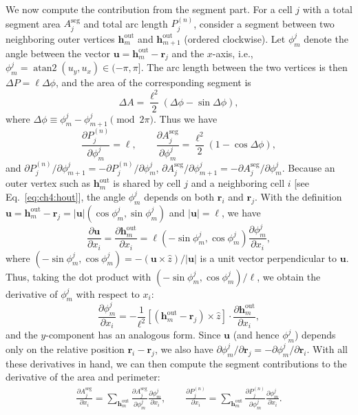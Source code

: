 We now compute the contribution from the segment part. For a cell $j$ with a total segment area $A_j^\textrm{seg}$ and total arc length $P_j^{(n)}$, consider a segment between two neighboring outer vertices $\mathbf{h}^\textrm{out}_m$ and $\mathbf{h}^\textrm{out}_{m+1}$ (ordered clockwise). Let $\phi_m^{j}$ denote the angle between the vector $\mathbf{u}=\mathbf{h}^\textrm{out}_m - \mathbf{r}_j$ and the $x$-axis, i.e., $\phi_m^j=\operatorname{atan2}(u_y, u_x)\in(-\pi,\pi]$. The arc length between the two vertices is then $\Delta P=\ell\Delta\phi$, and the area of the corresponding segment is
\begin{equation}
    \Delta A = \frac{\ell^2}{2}(\Delta\phi-\sin\Delta\phi),
\end{equation}
where $\Delta\phi\equiv \phi_m^{j}-\phi_{m+1}^{j}\pmod{2\pi}$. Thus we have
\begin{equation}
    \frac{\partial P_j^{(n)}}{\partial\phi_m^{j}}=\ell,\qquad\frac{\partial A^\textrm{seg}_j}{\partial\phi_{m}^{j}}=\frac{\ell^2}{2}(1-\cos\Delta\phi),
\end{equation}
and ${\partial P_j^{(n)}}/{\partial\phi_{m+1}^{j}} = -{\partial P_j^{(n)}}/{\partial\phi_{m}^{j}}$, ${\partial A^\textrm{seg}_j}/{\partial\phi_{m+1}^{j}}=-{\partial A^\textrm{seg}_j}/{\partial\phi_{m}^{j}}$.
Because an outer vertex such as $\mathbf{h}_m^\textrm{out}$ is shared by cell $j$ and a neighboring cell $i$ [see Eq.~\eqref{eq:ch4:hout}], the angle $\phi_m^{j}$ depends on both $\mathbf{r}_i$ and $\mathbf{r}_j$. With the definition $\mathbf{u}=\mathbf{h}_m^\textrm{out}-\mathbf{r}_j=|\mathbf{u}|(\cos\phi_m^j,\sin\phi_m^j)$ and $|\mathbf{u}|=\ell$, we have
\begin{equation}
    \frac{\partial \mathbf{u}}{\partial x_i}=\frac{\partial \mathbf{h}_m^\textrm{out}}{\partial x_i}=\ell(-\sin\phi_m^j,\cos\phi_m^j)\frac{\partial\phi_m^j}{\partial x_i},
\end{equation}
where $(-\sin\phi_m^j,\cos\phi_m^j)=-(\mathbf{u}\times\hat{z})/|\mathbf{u}|$ is a unit vector perpendicular to $\mathbf{u}$.
Thus, taking the dot product with $(-\sin\phi_m^j,\cos\phi_m^j)/\ell$, we obtain the derivative of $\phi_m^j$ with respect to $x_i$:
\begin{equation}
    \frac{\partial\phi_m^{j}}{\partial x_i}=-\frac{1}{\ell^2}[(\mathbf{h}_m^\textrm{out}-\mathbf{r}_j)\times\hat{z}]\cdot\frac{\partial\mathbf{h}_m^\textrm{out}}{\partial x_i},
\end{equation}
and the $y$-component has an analogous form.
Since $\mathbf{u}$ (and hence $\phi^j_m$) depends only on the relative position $\mathbf{r}_i-\mathbf{r}_j$, we also have $\partial{\phi^{j}_m}/\partial \mathbf{r}_j=-\partial{\phi^{j}_m}/\partial \mathbf{r}_i$. With all these derivatives in hand, we can then compute the segment contributions to the derivative of the area and perimeter:
\begin{eqnarray}
    \frac{\partial A_j^\textrm{seg}}{\partial x_i}=\sum_{\mathbf{h}_m^\textrm{out}}\frac{\partial A_j^\textrm{seg}}{\partial\phi_m^{j}}\frac{\partial\phi^{j}_m}{\partial x_i},\qquad\frac{\partial P_j^{(n)}}{\partial x_i}=\sum_{\mathbf{h}^\textrm{out}_m}\frac{\partial P_j^{(n)}}{\partial \phi_m^j}\frac{\partial \phi_m^j}{\partial x_i}.
\end{eqnarray}


